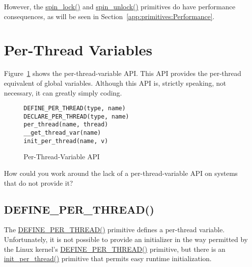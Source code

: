 However, the \url{spin_lock()} and \url{spin_unlock()} primitives
do have performance consequences, as will be seen in
Section~\ref{app:primitives:Performance}.

\section{Per-Thread Variables}
\label{app:primitives:Per-Thread Variables}

Figure~\ref{fig:intro:Per-Thread-Variable API}
shows the per-thread-variable API.
This API provides the per-thread equivalent of global variables.
Although this API is, strictly speaking, not necessary, it can
greatly simply coding.

\begin{figure}[htbp]
{ \scriptsize
\begin{verbatim}
DEFINE_PER_THREAD(type, name)
DECLARE_PER_THREAD(type, name)
per_thread(name, thread)
__get_thread_var(name)
init_per_thread(name, v)
\end{verbatim}
}
\caption{Per-Thread-Variable API}
\label{fig:intro:Per-Thread-Variable API}
\end{figure}

\QuickQuiz{}
	How could you work around the lack of a per-thread-variable
	API on systems that do not provide it?
 \QuickQuizEnd

\subsection{DEFINE\_PER\_THREAD()}

The \url{DEFINE_PER_THREAD()} primitive defines a per-thread variable.
Unfortunately, it is not possible to provide an initializer in the way
permitted by the Linux kernel's \url{DEFINE_PER_THREAD()} primitive,
but there is an \url{init_per_thread()} primitive that permits easy
runtime initialization.

